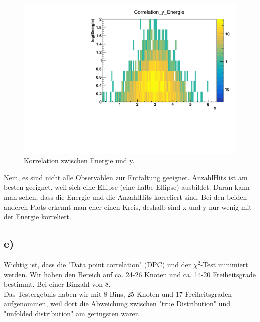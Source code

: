 \begin{figure}[H]
  \centering
  \includegraphics[height=0.4\textheight]{Bilder/CorY.pdf}
  \caption{Korrelation zwischen Energie und y.}
  \label{fig:CorY}
\end{figure}

Nein, es sind nicht alle Observablen zur Entfaltung geeignet. AnzahlHits ist am besten geeignet, weil sich eine Ellipse (eine halbe Ellipse) ausbildet. Daran kann man sehen, dass die Energie und die AnzahlHits korreliert sind. Bei den beiden anderen Plots erkennt man eher einen Kreis, deshalb sind x und y nur wenig mit der Energie korreliert.



\newpage
\subsection*{e)}
Wichtig ist, dass die "Data point correlation" (DPC) und der $\chi^2$-Test minimiert werden. Wir haben den Bereich auf ca. 24-26 Knoten und ca. 14-20 Freiheitsgrade bestimmt. Bei einer Binzahl von 8. \\
Das Testergebnis haben wir mit 8 Bins, 25 Knoten und 17 Freiheitsgraden aufgenommen, weil dort die Abweichung zwischen "true Distribution" und "unfolded distribution" am geringsten waren.


